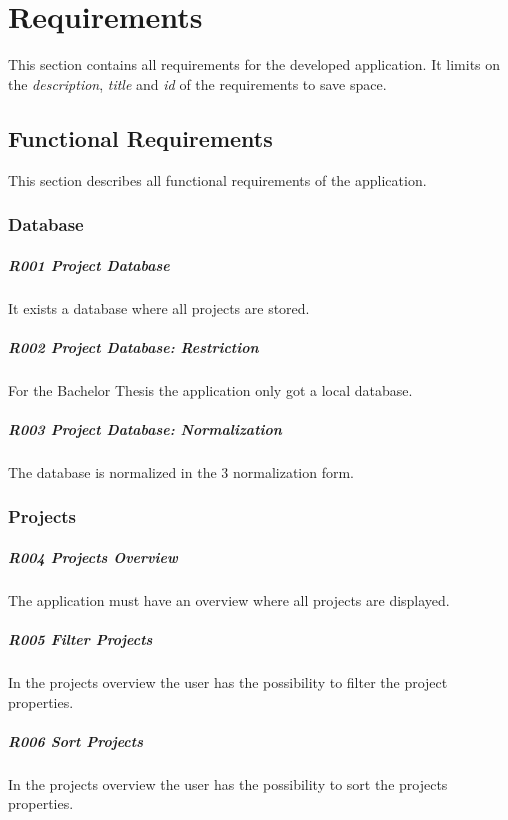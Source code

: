 \chapter{Requirements}
\label{app:RE}

This section contains all requirements for the developed application. It limits on the \textit{description}, \textit{title} and \textit{id} of the requirements to save space.

\section{Functional Requirements}
This section describes all functional requirements of the application.

\subsection{Database}
\paragraph{R001 Project Database}
It exists a database where all projects are stored.
\paragraph{R002 Project Database: Restriction}
For the Bachelor Thesis the application only got a local database.
\paragraph{R003 Project Database: Normalization}
The database is normalized in the 3 normalization form.

\subsection{Projects}
\paragraph{R004 Projects Overview}
The application must have an overview where all projects are displayed.
\paragraph{R005 Filter Projects}
In the projects overview the user has the possibility to filter the project properties.
\paragraph{R006 Sort Projects}
In the projects overview the user has the possibility to sort the projects properties.
